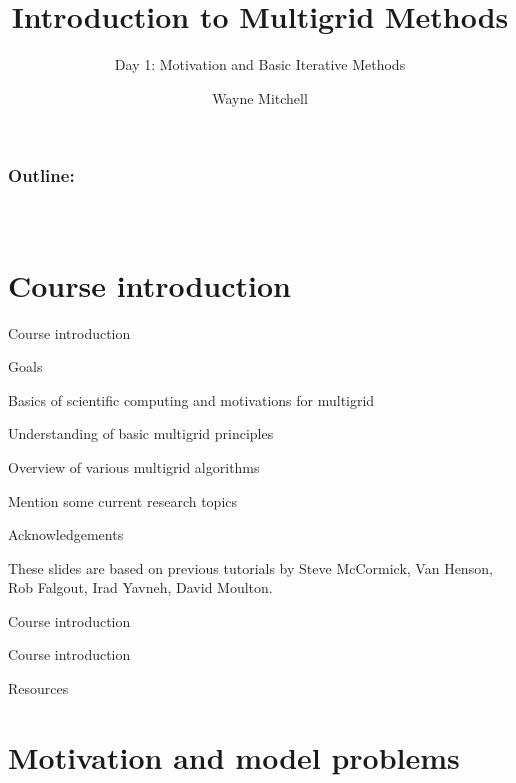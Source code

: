 \documentclass[18pt,xcolor=table]{beamer}
\title[Multigrid]{Introduction to Multigrid Methods}
\subtitle{Day 1: Motivation and Basic Iterative Methods}
\author[Mitchell]{Wayne Mitchell}
\institute{\pgfuseimage{logo}\\Universit\"at Heidelberg\\Institut f\"ur Technische Informatik}
\date[]{\alert{}}
\begin{document}


\DeclareRobustCommand{\Chi}{\raisebox{2pt}{$\chi$}}

\begin{frame}
\frametitle{\bf Outline:}
\framesubtitle{~~}
\tableofcontents
\end{frame}


\section{Course introduction}

\begin{frame}{Course introduction}
\begin{block}{Goals}
\bit
\item Basics of scientific computing and motivations for multigrid
\item Understanding of basic multigrid principles
\item Overview of various multigrid algorithms
\item Mention some current research topics
\eit
\end{block}
\begin{block}{Acknowledgements}
\bit
\item These slides are based on previous tutorials by Steve McCormick, Van Henson, Rob Falgout, Irad Yavneh, David Moulton.
\eit
\end{block}

\end{frame}

\begin{frame}{Course introduction}

\end{frame}

\begin{frame}{Course introduction}
\begin{block}{Resources}
\bit
\item 
\eit
\end{block}

\end{frame}


\section{Motivation and model problems}
\end{document}
